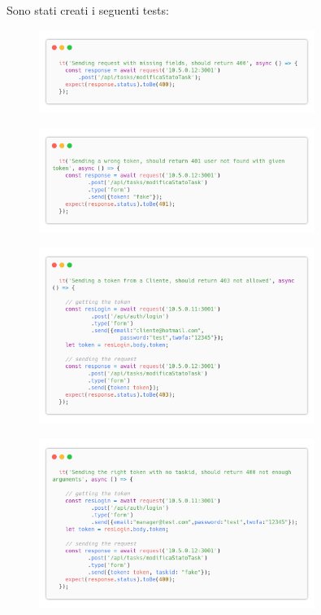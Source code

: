 \documentclass{report}
\begin{document}
Sono stati creati i seguenti tests:

\begin{figure}[H]
	\centering\includegraphics[width=0.8\textwidth]{images/code_modifica_stato_test1.png}
\end{figure}
\begin{figure}[H]
	\centering\includegraphics[width=0.8\textwidth]{images/code_modifica_stato_test2.png}
\end{figure}
\begin{figure}[H]
	\centering\includegraphics[width=0.8\textwidth]{images/code_modifica_stato_test3.png}
\end{figure}
\begin{figure}[H]
	\centering\includegraphics[width=0.8\textwidth]{images/code_modifica_stato_test4.png}
\end{figure}
\end{document}
